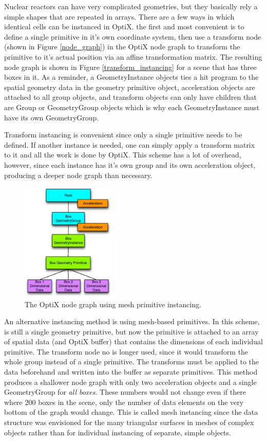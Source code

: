 Nuclear reactors can have very complicated geometries, but they basically rely a simple shapes that are repeated in arrays.  There are a few ways in which identical cells can be instanced in OptiX.  the first and most convenient is to define a single primitive in it's own coordinate system, then use a transform node (shown in Figure \ref{node_graph}) in the OptiX node graph to transform the primitive to it's actual position via an affine transformation matrix.  The resulting node graph is shown in Figure \ref{transform_instancing} for a scene that has three boxes in it.  As a reminder, a GeometryInstance objects ties a hit program to the spatial geometry data in the geometry primitive object, acceleration objects are attached to all group objects, and transform objects can only have children that are Group or GeometryGroup objects which is why each GeometryInstance must have its own GeometryGroup.

Transform instancing is convenient since only a single primitive needs to be defined.  If another instance is needed, one can simply apply a transform matrix to it and all the work is done by OptiX.  This scheme has a lot of overhead, however, since each instance has it's own group and its own acceleration object, producing a deeper node graph than necessary.

\begin{figure}[h!] 
  \centering
    \includegraphics[width=0.4\textwidth]{graphics/primitive_instancing.eps}
     \caption{The OptiX node graph using mesh primitive instancing. \label{primitive_instancing} }
\end{figure}

An alternative instancing method is using mesh-based primitives.  In this scheme, is still a single geometry primitive, but now the primitive is attached to an array of spatial data (and OptiX buffer) that contains the dimensions of each individual primitive.  The transform node no is longer used, since it would transform the whole group instead of a single primitive.   The transforms must be applied to the data beforehand and written into the buffer as separate primitives.  This method produces a shallower node graph with only two acceleration objects and a single GeometryGroup for \emph{all boxes}.  These numbers would not change even if there where 200 boxes in the scene, only the number of data elements on the very bottom of the graph would change.  This is called mesh instancing since the data structure was envisioned for the many triangular surfaces in meshes of complex objects rather than for individual instancing of separate, simple objects.

